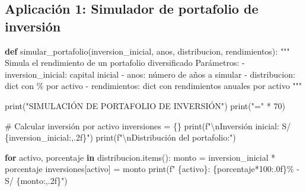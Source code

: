 \documentclass[
  doc,
  floatsintext,
  longtable,
  a4paper,
  nolmodern,
  notxfonts,
  notimes,
  12pt,
  colorlinks=true,linkcolor=blue,citecolor=blue,urlcolor=blue]{apa7}
\newenvironment{Shaded}{\begin{snugshade}}{\end{snugshade}}
\newcommand{\BuiltInTok}[1]{\textcolor[rgb]{0.00,0.23,0.31}{#1}}
\newcommand{\CharTok}[1]{\textcolor[rgb]{0.13,0.47,0.30}{#1}}
\newcommand{\CommentTok}[1]{\textcolor[rgb]{0.37,0.37,0.37}{#1}}
\newcommand{\ControlFlowTok}[1]{\textcolor[rgb]{0.00,0.23,0.31}{\textbf{#1}}}
\newcommand{\DecValTok}[1]{\textcolor[rgb]{0.68,0.00,0.00}{#1}}
\newcommand{\KeywordTok}[1]{\textcolor[rgb]{0.00,0.23,0.31}{\textbf{#1}}}
\newcommand{\NormalTok}[1]{\textcolor[rgb]{0.00,0.23,0.31}{#1}}
\newcommand{\OperatorTok}[1]{\textcolor[rgb]{0.37,0.37,0.37}{#1}}
\newcommand{\SpecialCharTok}[1]{\textcolor[rgb]{0.37,0.37,0.37}{#1}}
\newcommand{\SpecialStringTok}[1]{\textcolor[rgb]{0.13,0.47,0.30}{#1}}
\newcommand{\StringTok}[1]{\textcolor[rgb]{0.13,0.47,0.30}{#1}}
\begin{document}
\subsection{Aplicación 1: Simulador de portafolio de
inversión}\label{aplicaciuxf3n-1-simulador-de-portafolio-de-inversiuxf3n}

\begin{Shaded}
\begin{Highlighting}[]
\KeywordTok{def}\NormalTok{ simular\_portafolio(inversion\_inicial, anos, distribucion, rendimientos):}
    \CommentTok{"""}
\CommentTok{    Simula el rendimiento de un portafolio diversificado}
\CommentTok{    }
\CommentTok{    Parámetros:}
\CommentTok{    {-} inversion\_inicial: capital inicial}
\CommentTok{    {-} anos: número de años a simular}
\CommentTok{    {-} distribucion: dict con \% por activo}
\CommentTok{    {-} rendimientos: dict con rendimientos anuales por activo}
\CommentTok{    """}
    
    \BuiltInTok{print}\NormalTok{(}\StringTok{"SIMULACIÓN DE PORTAFOLIO DE INVERSIÓN"}\NormalTok{)}
    \BuiltInTok{print}\NormalTok{(}\StringTok{"="} \OperatorTok{*} \DecValTok{70}\NormalTok{)}
    
    \CommentTok{\# Calcular inversión por activo}
\NormalTok{    inversiones }\OperatorTok{=}\NormalTok{ \{\}}
    \BuiltInTok{print}\NormalTok{(}\SpecialStringTok{f"}\CharTok{\textbackslash{}n}\SpecialStringTok{Inversión inicial: S/ }\SpecialCharTok{\{}\NormalTok{inversion\_inicial}\SpecialCharTok{:,.2f\}}\SpecialStringTok{"}\NormalTok{)}
    \BuiltInTok{print}\NormalTok{(}\SpecialStringTok{f"}\CharTok{\textbackslash{}n}\SpecialStringTok{Distribución del portafolio:"}\NormalTok{)}
    
    \ControlFlowTok{for}\NormalTok{ activo, porcentaje }\KeywordTok{in}\NormalTok{ distribucion.items():}
\NormalTok{        monto }\OperatorTok{=}\NormalTok{ inversion\_inicial }\OperatorTok{*}\NormalTok{ porcentaje}
\NormalTok{        inversiones[activo] }\OperatorTok{=}\NormalTok{ monto}
        \BuiltInTok{print}\NormalTok{(}\SpecialStringTok{f"  }\SpecialCharTok{\{}\NormalTok{activo}\SpecialCharTok{\}}\SpecialStringTok{: }\SpecialCharTok{\{}\NormalTok{porcentaje}\OperatorTok{*}\DecValTok{100}\SpecialCharTok{:.0f\}}\SpecialStringTok{\% {-} S/ }\SpecialCharTok{\{}\NormalTok{monto}\SpecialCharTok{:,.2f\}}\SpecialStringTok{"}\NormalTok{)}
    

\end{Highlighting}
\end{Shaded}
\end{document}
